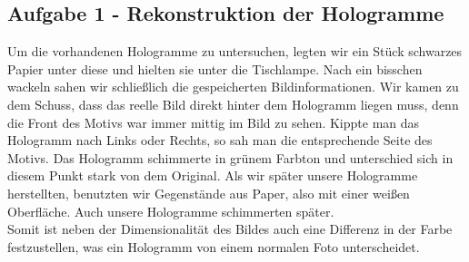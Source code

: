 \subsection*{Aufgabe 1 - Rekonstruktion der Hologramme}
Um die vorhandenen Hologramme zu untersuchen, legten wir ein Stück schwarzes Papier unter diese und hielten sie unter die Tischlampe. Nach ein bisschen wackeln sahen wir schließlich die gespeicherten Bildinformationen. Wir kamen zu dem Schuss, dass das reelle Bild direkt hinter dem Hologramm liegen muss, denn die Front des Motivs war immer mittig im Bild zu sehen. Kippte man das Hologramm nach Links oder Rechts, so sah man die entsprechende Seite des Motivs. Das Hologramm schimmerte in grünem Farbton und unterschied sich in diesem Punkt stark von dem Original. Als wir später unsere Hologramme herstellten, benutzten wir Gegenstände aus Paper, also mit einer weißen Oberfläche. Auch unsere Hologramme schimmerten später.\\
Somit ist neben der Dimensionalität des Bildes auch eine Differenz in der Farbe festzustellen, was ein Hologramm von einem normalen Foto unterscheidet.